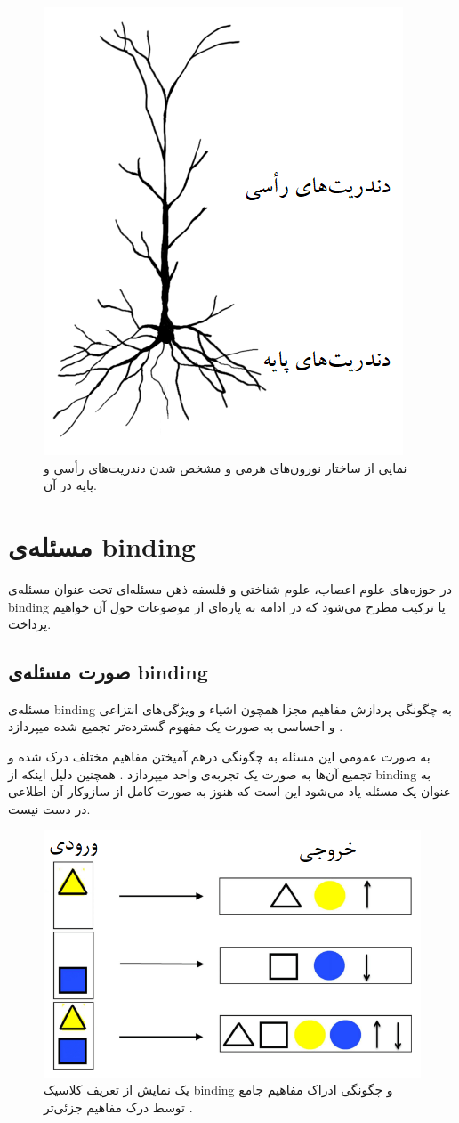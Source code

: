 \documentclass[12pt]{report}
\begin{document}
	\begin{figure}[H]
		\centering
		\includegraphics[width=0.5\linewidth]{pyramidal.png}
		\caption[NS]{
			نمایی از ساختار نورون‌های هرمی و مشخص شدن دندریت‌های رأسی و پایه در آن.
		}
		\label{fig:pyramidal}
	\end{figure}
	
	\section{مسئله‌ی \gls{binding}}
	
	در حوزه‌های علوم اعصاب، علوم شناختی و فلسفه ذهن مسئله‌ای تحت عنوان مسئله‌ی \gls{binding}
	یا ترکیب 
	مطرح می‌شود که در ادامه به پاره‌ای از موضوعات حول آن خواهیم پرداخت.
	
	\subsection{صورت مسئله‌ی \gls{binding}}
	مسئله‌ی \gls{binding} به چگونگی پردازش مفاهیم مجزا همچون اشیاء و ویژگی‌های انتزاعی و احساسی به صورت یک مفهوم گسترده‌تر تجمیع شده میپردازد
	\cite{REVONSUO1999123}.
	
	به صورت عمومی این مسئله به چگونگی در‌هم آمیختن مفاهیم مختلف درک شده و تجمیع آن‌ها به صورت یک تجربه‌ی واحد میپردازد
	\cite{Feldman2012}.
	همچنین دلیل اینکه از \gls{binding} به عنوان یک مسئله یاد می‌شود این است که هنوز به صورت کامل از سازوکار آن اطلاعی در دست نیست.
	
	\begin{figure}[H]
		\centering
		\includegraphics[width=0.7\linewidth]{binding.png}
		\caption[NS]{
			یک نمایش از تعریف کلاسیک \gls{binding} و چگونگی ادراک مفاهیم جامع توسط درک مفاهیم جزئی‌تر
			\cite{velic2012}.
		}
		\label{fig:binding}
	\end{figure}
	
\end{document}
